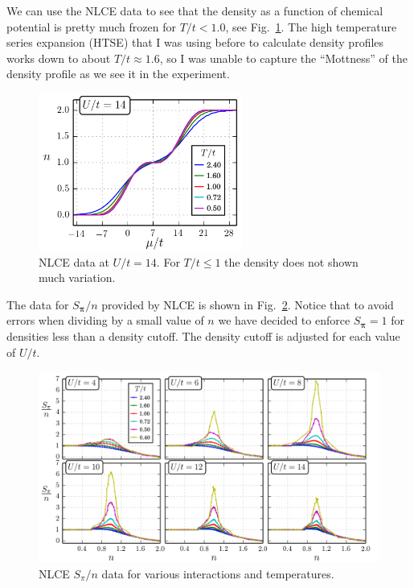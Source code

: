 \documentclass[11pt,letter]{article}
\newcommand{\bv}[1]{\ensuremath{\bm{#1}}}
\begin{document}
We can use the NLCE data to see that the density as a function of chemical
potential is pretty much frozen for $T/t<1.0$, see Fig.~\ref{fig:NLCEdens}.
The high temperature series expansion (HTSE) that I was using before to
calculate density profiles works down to about $T/t\approx 1.6$, so I was
unable to capture the ``Mottness'' of the density profile as we see it in the
experiment.
\begin{figure}
    \centering
\includegraphics[width=0.6\textwidth]{../dataplots/NLCE_Final/U14_varyT.png}
\caption{NLCE data at $U/t=14$.  For $T/t \leq 1$ the density does not shown
much variation. }
\label{fig:NLCEdens}
\end{figure}


The data for $S_{\bv{\pi}}/n$ provided by NLCE is shown in
Fig.~\ref{fig:NLCESpin}.  Notice that to avoid errors when dividing by a small
value of $n$ we have decided to enforce $S_{\bv{\pi}} = 1$  for densities less
than a density cutoff.  The density cutoff is adjusted for each value of $U/t$.
\begin{figure}
    \centering
\includegraphics[width=\textwidth]{../dataplots/NLCE_Final/Spi_varyU_varyT.png}
\caption{NLCE $S_{\pi}/n$  data for various interactions and temperatures.  }
\label{fig:NLCESpin}
\end{figure}
\end{document}
